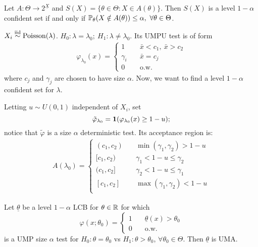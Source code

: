 \begin{thm}Let $A: \Theta\to 2^{\underline{X}}$ and $S(X) = \{ \theta\in \Theta:  X\in A(\theta) \}$. Then
	$S(X)$ is a level $1-\alpha$ confident set if and only if $\mathbb{P}_\theta(X \notin A(\theta)) \leq \alpha,\ \forall \theta \in \Theta$.
\end{thm} 

\begin{exap}
	$X_i \stackrel{\text{iid}}{\sim} \mathrm{Poisson}(\lambda)$. $H_0: \lambda=\lambda_0;\ H_1:\lambda \neq \lambda_0$. Its UMPU test is of form 
	\begin{align*}
		\varphi_{\lambda_0} (x) = \begin{cases}
		1 &\quad \bar{x}<c_1,\ \bar{x}>c_2 \\
		\gamma_i &\quad \bar{x}=c_j \\
		0 &\quad \text{o.w.}
		\end{cases}
	\end{align*}
	where $c_j$ and $\gamma_j$ are chosen to have size $\alpha$. Now, we want to find a level $1-\alpha$ confident set for $\lambda$.
	
	Letting $u\sim U(0,1)$ independent of $X_i$, set 
	$$\tilde{\varphi}_{\lambda_0} = \boldsymbol{1}( \varphi_{\lambda_0}(x) \geq 1-u );$$
	notice that $\tilde{\varphi}$ is a size $\alpha$ deterministic test. Its acceptance region is:
	\begin{align*}
		A(\lambda_0) = \begin{cases}
		(c_1, c_2) &\quad \min(\gamma_1,\gamma_2)> 1-u \\
		[c_1, c_2) &\quad \gamma_1 < 1-u \leq \gamma_2  \\
		(c_1, c_2] &\quad \gamma_2 < 1-u \leq \gamma_1  \\
		[c_1, c_2] &\quad \max(\gamma_1,\gamma_2) < 1 - u  \\
		\end{cases}
	\end{align*} 
\end{exap}

\begin{thm}
	Let $\underline{\theta}$ be a level $1-\alpha$ LCB for $\theta \in \mathbb{R}$ for which
	$$\varphi(x;\theta_0) = \begin{cases}
	1 &\quad \underline{\theta}(x) > \theta_0 \\
	0 &\quad \text{o.w.}
	\end{cases}$$
	is a UMP size $\alpha$ test for $H_0: \theta=\theta_0$ vs $H_1:\theta > \theta_0$, $\forall \theta_0\in \Theta$. Then $\underline{\theta}$ is UMA.
\end{thm}

